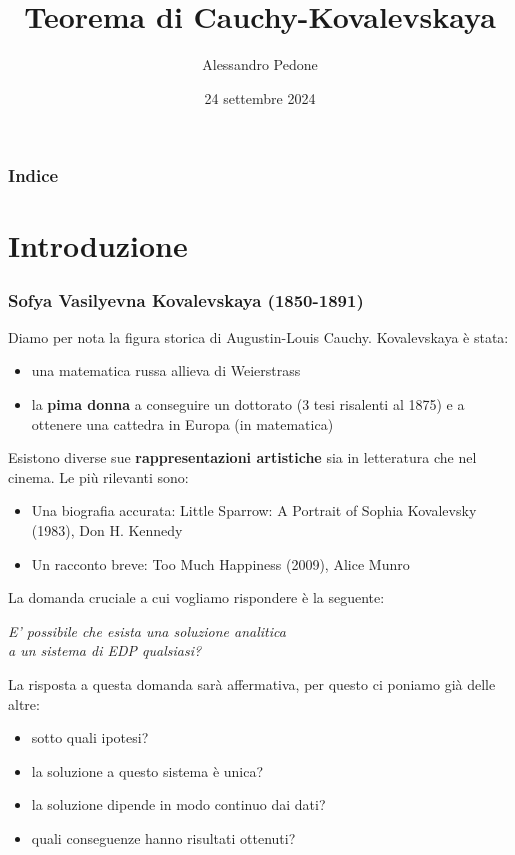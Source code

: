 \documentclass{beamer}
\title{Teorema di Cauchy-Kovalevskaya}
\author{Alessandro Pedone}
\institute{Politecnico di Milano}
\date{24 settembre 2024}
\begin{document}
\frame{\titlepage}
\begin{frame}
    \frametitle{Indice}
    \tableofcontents
\end{frame}


\section{Introduzione}

\begin{frame}
\frametitle{Sofya Vasilyevna Kovalevskaya (1850-1891)}
Diamo per nota la figura storica di Augustin-Louis Cauchy. 
Kovalevskaya è stata:
\begin{itemize}
\item una matematica russa allieva di Weierstrass
\item la \textbf{pima donna} a conseguire un dottorato (3 tesi risalenti al 1875) e a ottenere una cattedra in Europa (in matematica)
\end{itemize}
\end{frame}

\begin{frame}
Esistono diverse sue \textbf{rappresentazioni artistiche} sia in letteratura che nel cinema. Le più rilevanti sono:
\begin{itemize}
\item Una biografia accurata: Little Sparrow: A Portrait of Sophia Kovalevsky (1983), Don H. Kennedy
\item Un racconto breve: Too Much Happiness (2009), Alice Munro
\end{itemize}
\end{frame}


\begin{frame}
La domanda cruciale a cui vogliamo rispondere è la seguente: 
\begin{center}
\textit{E' possibile che esista una soluzione analitica \\ a un sistema di EDP qualsiasi?}
\end{center}
\end{frame}

\begin{frame}
La risposta a questa domanda sarà affermativa, per questo ci poniamo già delle altre: 
\begin{itemize}
\item sotto quali ipotesi?
\item la soluzione a questo sistema è unica?
\item la soluzione dipende in modo continuo dai dati?
\item quali conseguenze hanno risultati ottenuti?
\end{itemize}
\end{frame}
\end{document}
